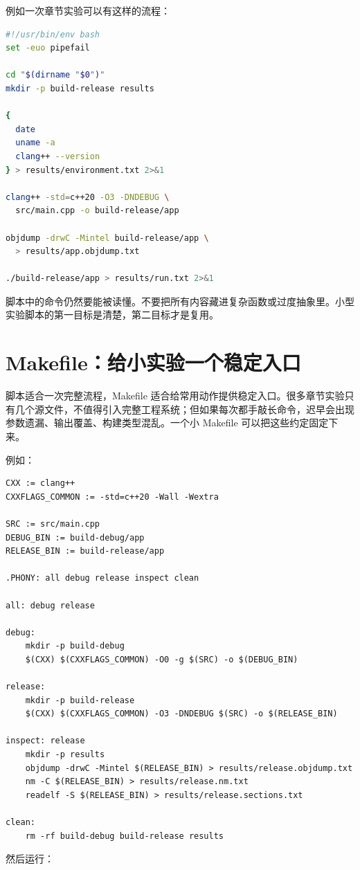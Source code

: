 例如一次章节实验可以有这样的流程：

\begin{lstlisting}[language=bash]
#!/usr/bin/env bash
set -euo pipefail

cd "$(dirname "$0")"
mkdir -p build-release results

{
  date
  uname -a
  clang++ --version
} > results/environment.txt 2>&1

clang++ -std=c++20 -O3 -DNDEBUG \
  src/main.cpp -o build-release/app

objdump -drwC -Mintel build-release/app \
  > results/app.objdump.txt

./build-release/app > results/run.txt 2>&1
\end{lstlisting}

脚本中的命令仍然要能被读懂。不要把所有内容藏进复杂函数或过度抽象里。小型实验脚本的第一目标是清楚，第二目标才是复用。

\section{Makefile：给小实验一个稳定入口}

脚本适合一次完整流程，Makefile 适合给常用动作提供稳定入口。很多章节实验只有几个源文件，不值得引入完整工程系统；但如果每次都手敲长命令，迟早会出现参数遗漏、输出覆盖、构建类型混乱。一个小 Makefile 可以把这些约定固定下来。

例如：

\begin{lstlisting}
CXX := clang++
CXXFLAGS_COMMON := -std=c++20 -Wall -Wextra

SRC := src/main.cpp
DEBUG_BIN := build-debug/app
RELEASE_BIN := build-release/app

.PHONY: all debug release inspect clean

all: debug release

debug:
	mkdir -p build-debug
	$(CXX) $(CXXFLAGS_COMMON) -O0 -g $(SRC) -o $(DEBUG_BIN)

release:
	mkdir -p build-release
	$(CXX) $(CXXFLAGS_COMMON) -O3 -DNDEBUG $(SRC) -o $(RELEASE_BIN)

inspect: release
	mkdir -p results
	objdump -drwC -Mintel $(RELEASE_BIN) > results/release.objdump.txt
	nm -C $(RELEASE_BIN) > results/release.nm.txt
	readelf -S $(RELEASE_BIN) > results/release.sections.txt

clean:
	rm -rf build-debug build-release results
\end{lstlisting}

然后运行：

